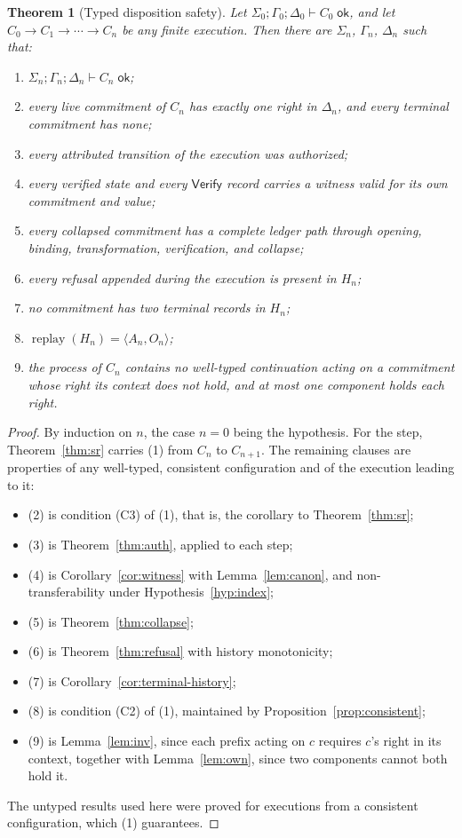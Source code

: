 \documentclass[11pt,openany]{book}
\newtheorem{theorem}{Theorem}[chapter]
\theoremstyle{remark}
\newcommand{\Verify}{\mathsf{Verify}}
\newcommand{\replay}{\operatorname{replay}}
\begin{document}
\begin{theorem}[Typed disposition safety]\label{thm:tds}
Let $\Sigma_0;\Gamma_0;\Delta_0\vdash C_0\;\mathsf{ok}$, and let
$C_0\to C_1\to\cdots\to C_n$ be any finite execution. Then there are
$\Sigma_n$, $\Gamma_n$, $\Delta_n$ such that:
\begin{enumerate}[label=(\arabic*)]
\item $\Sigma_n;\Gamma_n;\Delta_n\vdash C_n\;\mathsf{ok}$;
\item every live commitment of $C_n$ has exactly one right in $\Delta_n$,
and every terminal commitment has none;
\item every attributed transition of the execution was authorized;
\item every verified state and every $\Verify$ record carries a witness
valid for its own commitment and value;
\item every collapsed commitment has a complete ledger path through
opening, binding, transformation, verification, and collapse;
\item every refusal appended during the execution is present in $H_n$;
\item no commitment has two terminal records in $H_n$;
\item $\replay(H_n)=\langle A_n,O_n\rangle$;
\item the process of $C_n$ contains no well-typed continuation acting on a
commitment whose right its context does not hold, and at most one
component holds each right.
\end{enumerate}
\end{theorem}

\begin{proof}
By induction on $n$, the case $n=0$ being the hypothesis. For the step,
Theorem~\ref{thm:sr} carries (1) from $C_n$ to $C_{n+1}$. The remaining
clauses are properties of any well-typed, consistent configuration and
of the execution leading to it:
\begin{itemize}[leftmargin=1.5em]
\item (2) is condition (C3) of (1), that is, the corollary to
Theorem~\ref{thm:sr};
\item (3) is Theorem~\ref{thm:auth}, applied to each step;
\item (4) is Corollary~\ref{cor:witness} with Lemma~\ref{lem:canon}, and
non-transferability under Hypothesis~\ref{hyp:index};
\item (5) is Theorem~\ref{thm:collapse};
\item (6) is Theorem~\ref{thm:refusal} with history monotonicity;
\item (7) is Corollary~\ref{cor:terminal-history};
\item (8) is condition (C2) of (1), maintained by
Proposition~\ref{prop:consistent};
\item (9) is Lemma~\ref{lem:inv}, since each prefix acting on $c$ requires
$c$'s right in its context, together with Lemma~\ref{lem:own}, since two
components cannot both hold it.
\end{itemize}
The untyped results used here were proved for executions from a
consistent configuration, which (1) guarantees.
\end{proof}
\end{document}
